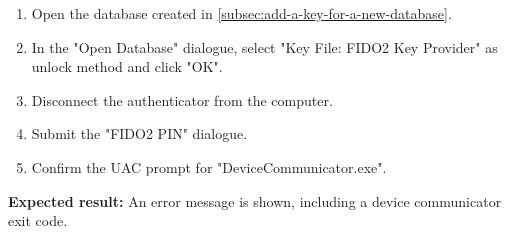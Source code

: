 \begin{enumerate}
	\item Open the database created in \autoref{subsec:add-a-key-for-a-new-database}.
	\item In the "Open Database" dialogue, select "Key File: FIDO2 Key Provider" as unlock method and click "OK".
	\item Disconnect the authenticator from the computer.
	\item Submit the "FIDO2 PIN" dialogue.
	\item Confirm the UAC prompt for "DeviceCommunicator.exe".
\end{enumerate}

\textbf{Expected result:}
An error message is shown, including a device communicator exit code.
